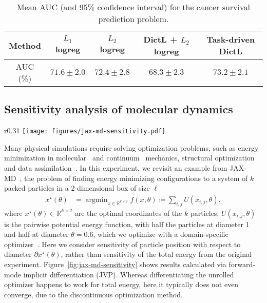 \documentclass{article}
\def\RR{{\mathbb R}}
\DeclareMathOperator*{\argmin}{argmin}
\begin{document}
\begin{table}[t]
\caption{Mean AUC (and 95\% confidence interval) for the cancer survival prediction problem.}
\begin{center}
\begin{tabular}{c|cccc}
\toprule
Method & $L_1$ logreg & $L_2$ logreg & DictL + $L_2$ logreg & Task-driven DictL \\
\midrule
AUC (\%)& $71.6 \pm 2.0$ & $72.4 \pm 2.8$ & $68.3 \pm 2.3$ & $73.2 \pm 2.1$\\
\bottomrule
\end{tabular}
\end{center}
\label{tab:cancerAUC}
\end{table}

\subsection{Sensitivity analysis of molecular dynamics}

\begin{wrapfigure}[16]{r}{0.31\textwidth}
    \centering
    \vspace{-0.8cm}
    \texttt{[image: figures/jax-md-sensitivity.pdf]}\\
    \caption{Particle positions and position sensitivity vectors, with respect
    to increasing the diameter of the blue particles.}
    \label{fig:jax-md-sensitivity}
\end{wrapfigure}

Many physical simulations require solving optimization problems,
such as energy minimization in molecular~\cite{jax-md} and
continuum~\cite{beatson2020composable} mechanics, structural
optimization~\cite{neural-reparam-2019} and data
assimilation~\cite{invobs_da2021}.  
In this experiment,
we revisit an example from JAX-MD~\cite{jax-md}, the problem of finding energy
minimizing configurations to a system of $k$ packed particles in a
$2$-dimensional box of size $\ell$
\begin{align}
x^\star(\theta)
&=
\argmin_{x \in \mathbb{R}^{k \times 2}}
f(x, \theta) \coloneqq \sum_{i,j} U(x_{i,j}, \theta),
\label{eq:jax-md}
\end{align}
where $x^\star(\theta) \in \RR^{k \times 2}$ are the optimal coordinates of the
$k$ particles, $U(x_{i,j}, \theta)$ is the pairwise potential energy function,
with half the particles at diameter 1 and half at diameter $\theta=0.6$, which
we optimize with a domain-specific optimizer~\cite{structural-relaxation-2006}.
Here we consider sensitivity of particle position with respect to diameter
$\partial x^\star(\theta)$, rather than sensitivity of the total energy from the
original experiment.  Figure~\ref{fig:jax-md-sensitivity} shows results
calculated via forward-mode implicit differentiation (JVP).  Whereas
differentiating the unrolled optimizer happens to work for total energy, here it
typically does not even converge, due to the discontinuous optimization method.
\end{document}
